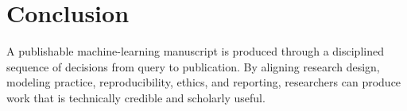 \section{Conclusion}

A publishable machine-learning manuscript is produced through a disciplined sequence of decisions from query to publication. By aligning research design, modeling practice, reproducibility, ethics, and reporting, researchers can produce work that is technically credible and scholarly useful.
